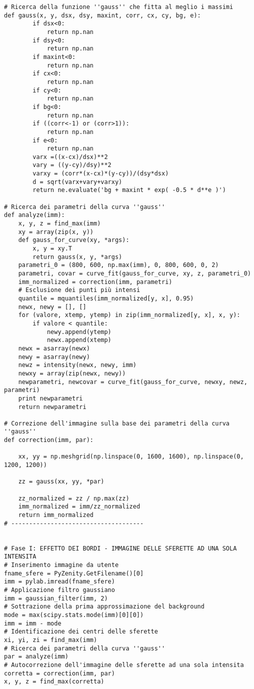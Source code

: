 \begin{lstlisting}
# Ricerca della funzione ''gauss'' che fitta al meglio i massimi
def gauss(x, y, dsx, dsy, maxint, corr, cx, cy, bg, e):
        if dsx<0:
            return np.nan
        if dsy<0:
            return np.nan
        if maxint<0:
            return np.nan
        if cx<0:
            return np.nan
        if cy<0:
            return np.nan
        if bg<0: 
            return np.nan
        if ((corr<-1) or (corr>1)):
            return np.nan
        if e<0:
            return np.nan
        varx =((x-cx)/dsx)**2
        vary = ((y-cy)/dsy)**2
        varxy = (corr*(x-cx)*(y-cy))/(dsy*dsx)
        d = sqrt(varx+vary+varxy)
        return ne.evaluate('bg + maxint * exp( -0.5 * d**e )')
        
# Ricerca dei parametri della curva ''gauss''
def analyze(imm):
    x, y, z = find_max(imm)
    xy = array(zip(x, y))
    def gauss_for_curve(xy, *args):
        x, y = xy.T
        return gauss(x, y, *args)
    parametri_0 = (800, 600, np.max(imm), 0, 800, 600, 0, 2)
    parametri, covar = curve_fit(gauss_for_curve, xy, z, parametri_0)
    imm_normalized = correction(imm, parametri)
    # Esclusione dei punti più intensi
    quantile = mquantiles(imm_normalized[y, x], 0.95)
    newx, newy = [], []
    for (valore, xtemp, ytemp) in zip(imm_normalized[y, x], x, y):
        if valore < quantile:
            newy.append(ytemp) 
            newx.append(xtemp)
    newx = asarray(newx) 
    newy = asarray(newy)
    newz = intensity(newx, newy, imm)
    newxy = array(zip(newx, newy))
    newparametri, newcovar = curve_fit(gauss_for_curve, newxy, newz, parametri)
    print newparametri
    return newparametri

# Correzione dell'immagine sulla base dei parametri della curva ''gauss''
def correction(imm, par):

    xx, yy = np.meshgrid(np.linspace(0, 1600, 1600), np.linspace(0, 1200, 1200))
    
    zz = gauss(xx, yy, *par)
    
    zz_normalized = zz / np.max(zz)
    imm_normalized = imm/zz_normalized
    return imm_normalized 
# -------------------------------------


# Fase I: EFFETTO DEI BORDI - IMMAGINE DELLE SFERETTE AD UNA SOLA INTENSITA
# Inserimento immagine da utente
fname_sfere = PyZenity.GetFilename()[0]
imm = pylab.imread(fname_sfere)
# Applicazione filtro gaussiano
imm = gaussian_filter(imm, 2)
# Sottrazione della prima approssimazione del background
mode = max(scipy.stats.mode(imm)[0][0])
imm = imm - mode
# Identificazione dei centri delle sferette
xi, yi, zi = find_max(imm)
# Ricerca dei parametri della curva ''gauss''
par = analyze(imm)
# Autocorrezione dell'immagine delle sferette ad una sola intensita
corretta = correction(imm, par)
x, y, z = find_max(corretta)



\end{lstlisting}
